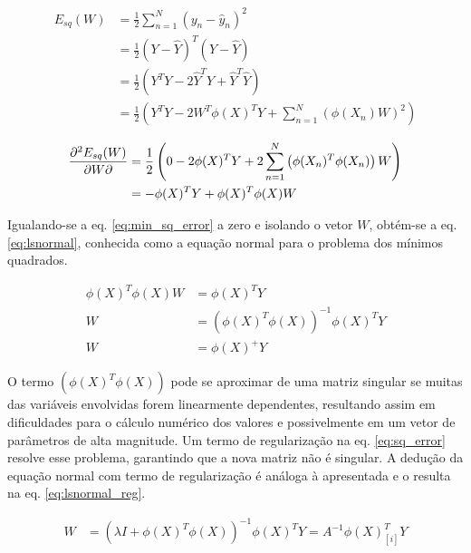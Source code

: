 \begin{equation}
\begin{split}
      E_{sq}(W) {}&= \frac{1}{2} \sum_{n = 1}^{N}\left(y_n-\hat{y}_n\right)^2 \\
      &= \frac{1}{2} (Y-\hat{Y})^T(Y-\hat{Y})\\
      &= \frac{1}{2} \left( Y^TY - 2 \hat{Y}^TY + \hat{Y}^T\hat{Y} \right)\\
      &= \frac{1}{2} \left( Y^TY - 2 W^T\phi(X)^TY + \sum_{n = 1}^{N}\left(\phi(X_n)W \right)^2 \right)
    \label{eq:sq_error}  
\end{split}
\end{equation}

\begin{equation}\begin{split}
    \pdv{E_{sq}(W)}{W} {}&= \frac{1}{2} \left( 0 - 2 \phi(X)^TY + 2\sum_{n = 1}^{N}\left(\phi(X_n)^T\phi(X_n) \right)W  \right) \\
    &= - \phi(X)^TY + \phi(X)^T\phi(X) W
    \label{eq:min_sq_error}
\end{split}\end{equation}

Igualando-se a eq. \ref{eq:min_sq_error} a zero e isolando o vetor $W$, obtém-se a eq. \ref{eq:lsnormal}, conhecida como a equação normal para o problema dos mínimos quadrados.

\begin{equation}\begin{split}
    \phi(X)^T\phi(X) W &= \phi(X)^TY \\
    W &= (\phi(X)^T\phi(X))^{-1}\phi(X)^TY \\
    W &=\phi(X)^+ Y
    \label{eq:lsnormal}
\end{split}\end{equation}

O termo $(\phi(X)^T\phi(X))$ pode se aproximar de uma matriz singular se muitas das variáveis envolvidas forem linearmente dependentes, resultando assim em dificuldades para o cálculo numérico dos valores e possivelmente em um vetor de parâmetros de alta magnitude. Um termo de regularização na eq. \ref{eq:sq_error} resolve esse problema, garantindo que a nova matriz não é singular. A dedução da equação normal com termo de regularização é análoga à apresentada e o resulta na eq. \ref{eq:lsnormal_reg}.

\begin{equation}\begin{split}
    W &= (\lambda I + \phi(X)^T\phi(X))^{-1}\phi(X)^TY = A^{-1}\phi(X)_{[i]}^TY
    \label{eq:lsnormal_reg}
\end{split}\end{equation}


